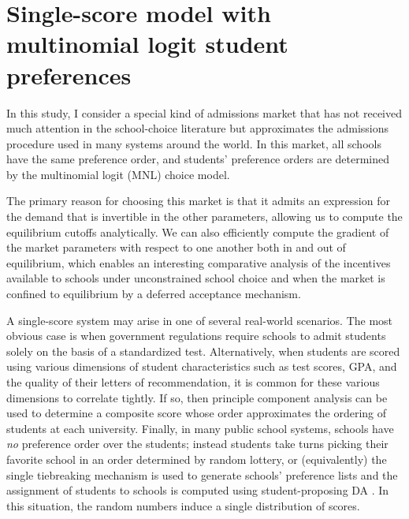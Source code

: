 \documentclass[12pt]{article}
\theoremstyle{definition}
\begin{document}
\section{Single-score model with multinomial logit student preferences} \label{singlescoremodel}
In this study, I consider a special kind of admissions market that has not received much attention in the school-choice literature but approximates the admissions procedure used in many systems around the world. In this market, all schools have the same preference order, and students' preference orders are determined by the multinomial logit (MNL) choice model.

The primary reason for choosing this market is that it admits an expression for the demand that is invertible in the other parameters, allowing us to compute the equilibrium cutoffs analytically. We can also efficiently compute the gradient of the market parameters with respect to one another both in and out of equilibrium, which enables an interesting comparative analysis of the incentives available to schools under unconstrained school choice and when the market is confined to equilibrium by a deferred acceptance mechanism.

A single-score system may arise in one of several real-world scenarios. The most obvious case is when government regulations require schools to admit students solely on the basis of a standardized test. Alternatively, when students are scored using various dimensions of student characteristics such as test scores, GPA, and the quality of their letters of recommendation, it is common for these various dimensions to correlate tightly. If so, then principle component analysis can be used to determine a composite score whose order approximates the ordering of students at each university. Finally, in many public school systems, schools have \emph{no} preference order over the students; instead students take turns picking their favorite school in an order determined by random lottery, or (equivalently) the single tiebreaking mechanism is used to generate schools’ preference lists and the assignment of students to schools is computed using student-proposing DA \parencite[][]{whatmatters}. In this situation, the random numbers induce a single distribution of scores.
\end{document}
